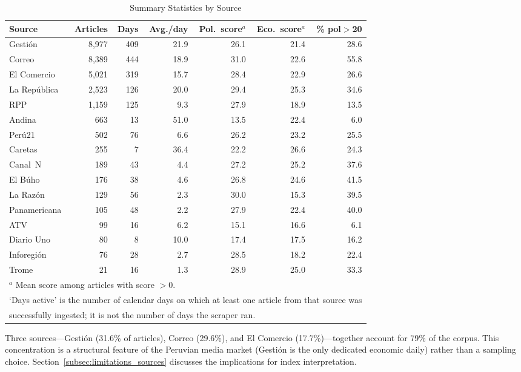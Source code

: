 \documentclass[12pt,a4paper]{article}
\begin{document}
\begin{table}[h!]
\centering
\caption{Summary Statistics by Source}
\label{tab:sources}
\begin{tabular}{lrrrrrr}
\toprule
Source & Articles & Days & Avg./day & Pol.\ score$^a$ & Eco.\ score$^a$ & \% pol$>$20 \\
\midrule
Gesti\'on     & 8,977 & 409 & 21.9 & 26.1 & 21.4 & 28.6 \\
Correo        & 8,389 & 444 & 18.9 & 31.0 & 22.6 & 55.8 \\
El Comercio   & 5,021 & 319 & 15.7 & 28.4 & 22.9 & 26.6 \\
La Rep\'ublica & 2,523 & 126 & 20.0 & 29.4 & 25.3 & 34.6 \\
RPP           & 1,159 & 125 &  9.3 & 27.9 & 18.9 & 13.5 \\
Andina        &   663 &  13 & 51.0 & 13.5 & 22.4 &  6.0 \\
Per\'u21      &   502 &  76 &  6.6 & 26.2 & 23.2 & 25.5 \\
Caretas       &   255 &   7 & 36.4 & 22.2 & 26.6 & 24.3 \\
Canal~N       &   189 &  43 &  4.4 & 27.2 & 25.2 & 37.6 \\
El B\'uho     &   176 &  38 &  4.6 & 26.8 & 24.6 & 41.5 \\
La Raz\'on    &   129 &  56 &  2.3 & 30.0 & 15.3 & 39.5 \\
Panamericana  &   105 &  48 &  2.2 & 27.9 & 22.4 & 40.0 \\
ATV           &    99 &  16 &  6.2 & 15.1 & 16.6 &  6.1 \\
Diario Uno    &    80 &   8 & 10.0 & 17.4 & 17.5 & 16.2 \\
Inforegi\'on  &    76 &  28 &  2.7 & 28.5 & 18.2 & 22.4 \\
Trome         &    21 &  16 &  1.3 & 28.9 & 25.0 & 33.3 \\
\bottomrule
\multicolumn{7}{l}{\footnotesize $^a$ Mean score among articles with score $>0$.} \\
\multicolumn{7}{l}{\footnotesize `Days active' is the number of calendar days on which at least one article from that source was} \\
\multicolumn{7}{l}{\footnotesize successfully ingested; it is not the number of days the scraper ran.}
\end{tabular}
\end{table}

Three sources---Gesti\'on (31.6\% of articles), Correo (29.6\%), and El
Comercio (17.7\%)---together account for 79\% of the corpus.  This
concentration is a structural feature of the Peruvian media market
(Gesti\'on is the only dedicated economic daily) rather than a sampling
choice.  Section~\ref{subsec:limitations_sources} discusses the implications
for index interpretation.
\end{document}
